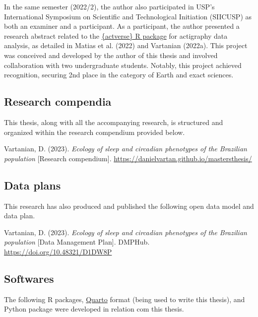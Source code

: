 \documentclass[
  12pt,
  a4paper,
  oneside]{tesesusp}
\begin{document}
\vspace{15pt}

In the same semester (2022/2), the author also participated in USP's
International Symposium on Scientific and Technological Initiation
(SIICUSP) as both an examiner and a participant. As a participant, the
author presented a research abstract related to the
\href{https://github.com/giperbio/actverse}{\{actverse\} R package} for
actigraphy data analysis, as detailed in Matias et al. (2022) and
Vartanian (2022a). This project was conceived and developed by the
author of this thesis and involved collaboration with two undergraduate
students. Notably, this project achieved recognition, securing 2nd place
in the category of Earth and exact sciences.

\hypertarget{research-compendia}{%
\subsection{Research compendia}\label{research-compendia}}

This thesis, along with all the accompanying research, is structured and
organized within the research compendium provided below.

\vspace{15pt}

\noindent Vartanian, D. (2023). \emph{Ecology of sleep and circadian
phenotypes of the Brazilian population} {[}Research compendium{]}.
\url{https://danielvartan.github.io/mastersthesis/}

\hypertarget{data-plans}{%
\subsection{Data plans}\label{data-plans}}

This research has also produced and published the following open data
model and data plan.

\vspace{15pt}

\noindent Vartanian, D. (2023). \emph{Ecology of sleep and circadian
phenotypes of the Brazilian population} {[}Data Management Plan{]}.
DMPHub. \url{https://doi.org/10.48321/D1DW8P}

\hypertarget{softwares}{%
\subsection{Softwares}\label{softwares}}

The following R packages, \href{https://quarto.org/}{Quarto} format
(being used to write this thesis), and Python package were developed in
relation com this thesis.
\end{document}
